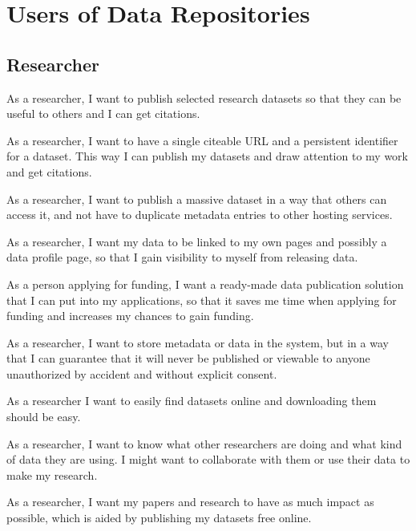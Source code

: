 \chapter{Users of Data Repositories}
\label{chapter:first-appendix}

\footnotesize

\section{Researcher}

\begin{compactitem}
    \item As a researcher, I want to publish selected research datasets so that they
          can be useful to others and I can get citations.
    \item As a researcher, I want to have a single citeable URL and a persistent identifier for a dataset.
          This way I can publish my datasets and draw attention to my
          work and get citations. 
    \item As a researcher, I want to publish a massive dataset in a way that
          others can access it, and not have to duplicate metadata entries to
          other hosting services.
    \item As a researcher, I want my data to be linked to my
          own pages and possibly a data profile page, so that I gain visibility
          to myself from releasing data. 
    \item As a person applying for funding, I want a ready-made data publication
          solution that I can put into my
          applications, so that it saves me time when applying for funding and
          increases my chances to gain funding. 
    \item As a researcher, I want to store metadata or data in the system, but in a way
          that I can guarantee that it will never be published or viewable to
          anyone unauthorized by accident and without explicit consent.
    \item As a researcher I want to easily find datasets online and downloading them
          should be easy.
    \item As a researcher, I want to know what other researchers are doing and
          what kind of data they are using. I might want to collaborate with
          them or use their data to make my research.
    \item As a researcher, I want my papers and research to have as much impact
          as possible, which is aided by publishing my datasets free online.

\end{compactitem}
